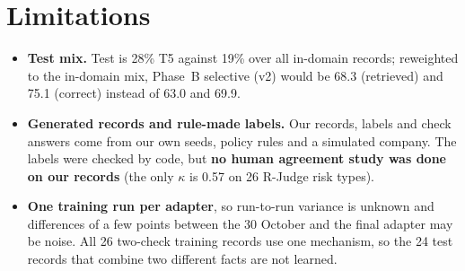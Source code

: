 \documentclass[10pt]{article}
\begin{document}
\section{Limitations}\label{sec:limits}
\begin{itemize}
\item \textbf{Test mix.} Test is 28\% T5 against 19\% over all in-domain records; reweighted to the
  in-domain mix, Phase~B selective (v2) would be 68.3 (retrieved) and 75.1 (correct) instead of 63.0 and 69.9.
\item \textbf{Generated records and rule-made labels.} Our records, labels and check answers come from our own
  seeds, policy rules and a simulated company. The labels were checked by code, but \textbf{no human
  agreement study was done on our records} (the only $\kappa$ is 0.57 on 26 R-Judge risk types).
\item \textbf{One training run per adapter}, so run-to-run variance is unknown and differences of a few points
  between the 30 October and the final adapter may be noise. All 26 two-check training records use one
  mechanism, so the 24 test records that combine two different facts are not learned.
\end{itemize}
\end{document}
